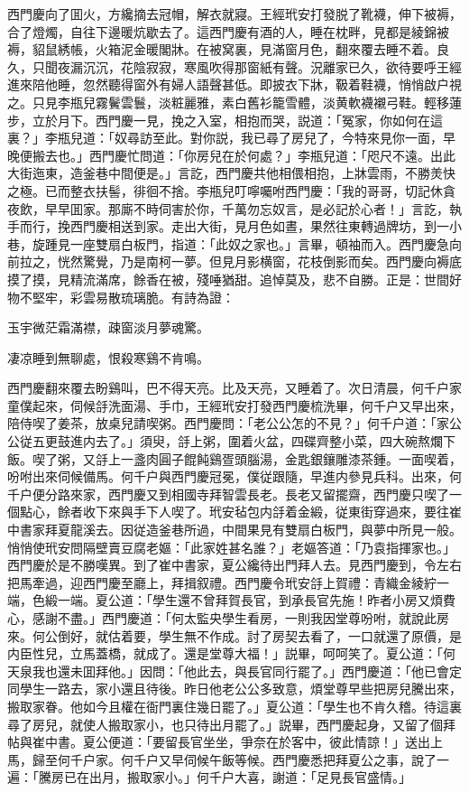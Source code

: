西門慶向了囬火，方纔摘去冠帽，解衣就寢。王經玳安打發脱了靴襪，伸下被褥，合了燈燭，自往下邊暖炕歇去了。這西門慶有酒的人，睡在枕畔，見都是綾錦被褥，貂鼠綉帳，火箱泥金暖閣牀。在被窝裏，見滿窗月色，翻來覆去睡不着。良久，只聞夜漏沉沉，花陰寂寂，寒風吹得那窗紙有聲。況離家已久，欲待要呼王經進來陪他睡，忽然聽得窗外有婦人語聲甚低。即披衣下牀，靸着鞋襪，悄悄啟户視之。只見李瓶兒霧鬢雲鬟，淡粧麗雅，素白舊衫籠雪體，淡黄軟襪襯弓鞋。輕移蓮步，立於月下。西門慶一見，挽之入室，相抱而哭，説道：「冤家，你如何在這裏？」李瓶兒道：「奴尋訪至此。對你説，我已尋了房兒了，今特來見你一面，早晚便搬去也。」西門慶忙問道：「你房兒在於何處？」李瓶兒道：「咫尺不遠。出此大街迤東，造釜巷中間便是。」言訖，西門慶共他相偎相抱，上牀雲雨，不勝羙快之極。已而整衣扶髻，徘徊不捨。李瓶兒叮嚀囑咐西門慶：「我的哥哥，切記休貪夜飲，早早囬家。那廝不時伺害於你，千萬勿忘奴言，是必記於心者！」言訖，執手而行，挽西門慶相送到家。走出大街，見月色如晝，果然往東轉過牌坊，到一小巷，旋踵見一座雙扇白板門，指道：「此奴之家也。」言畢，頓袖而入。西門慶急向前拉之，恍然驚覺，乃是南柯一夢。但見月影横窗，花枝倒影而矣。西門慶向褥底摸了摸，見精流滿席，餘香在被，殘唾猶甜。追悼莫及，悲不自勝。正是：世間好物不堅牢，彩雲易散琉璃脆。有詩為證：

玉宇微茫霜滿襟，疎窗淡月夢魂驚。

凄凉睡到無聊處，恨殺寒鷄不肯鳴。

西門慶翻來覆去盼鷄叫，巴不得天亮。比及天亮，又睡着了。次日清晨，何千户家童僕起來，伺候㧱洗面湯、手巾，王經玳安打發西門慶梳洗畢，何千户又早出來，陪侍喫了姜茶，放桌兒請喫粥。西門慶問：「老公公怎的不見？」何千户道：「家公公従五更鼓進内去了。」須臾，㧱上粥，圍着火盆，四碟齊整小菜，四大碗熬爛下飯。喫了粥，又㧱上一盞肉圓子餛飩鷄疍頭腦湯，金匙銀鑲雕漆茶鍾。一面喫着，吩咐出來伺候備馬。何千户與西門慶冠冕，僕従跟隨，早進内參見兵科。出來，何千户便分路來家，西門慶又到相國寺拜智雲長老。長老又留擺齋，西門慶只喫了一個點心，餘者收下來與手下人喫了。玳安毡包内㧱着金緞，従東街穿過來，要往崔中書家拜夏龍溪去。因従造釜巷所過，中間果見有雙扇白板門，與夢中所見一般。悄悄使玳安問隔壁賣豆腐老嫗：「此家姓甚名誰？」老嫗答道：「乃袁指揮家也。」西門慶於是不勝嘆異。到了崔中書家，夏公纔待出門拜人去。見西門慶到，令左右把馬牽過，迎西門慶至廳上，拜揖叙禮。西門慶令玳安㧱上賀禮：青織金綾紵一端，色緞一端。夏公道：「學生還不曾拜賀長官，到承長官先施！昨者小房又煩費心，感謝不盡。」西門慶道：「何太監央學生看房，一則我因堂尊吩咐，就說此房來。何公倒好，就估着要，學生無不作成。討了房契去看了，一口就還了原價，是内臣性兒，立馬蓋橋，就成了。還是堂尊大福！」説畢，呵呵笑了。夏公道：「何天泉我也還未囬拜他。」因問：「他此去，與長官同行罷了。」西門慶道：「他已會定同學生一路去，家小還且待後。昨日他老公公多致意，煩堂尊早些把房兒騰出來，搬取家眷。他如今且權在衙門裏住幾日罷了。」夏公道：「學生也不肯久稽。待這裏尋了房兒，就使人搬取家小，也只待出月罷了。」説畢，西門慶起身，又留了個拜帖與崔中書。夏公便道：「要留長官坐坐，爭奈在於客中，彼此情諒！」送出上馬，歸至何千户家。何千户又早伺候午飯等候。西門慶悉把拜夏公之事，說了一遍：「騰房已在出月，搬取家小。」何千户大喜，謝道：「足見長官盛情。」


